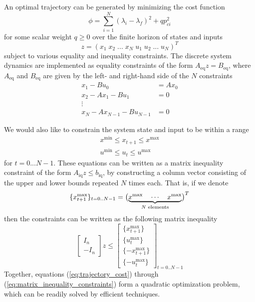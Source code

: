 An optimal trajectory can be generated by minimizing the cost function
\begin{equation}
    \label{eq:trajectory_cost}
    \phi = \sum_{i=1}^{N}(\lambda_i - \lambda_f)^2 + qp_{ci}^2
\end{equation}
for some scalar weight $q \geq 0$ over the finite horizon of states and inputs
\begin{equation}
    z = (x_1 \; x_2 \; ... \; x_N \; u_1 \; u_2 \; ... \; u_N)^T
\end{equation}
subject to various equality and inequality constraints. The discrete system dynamics are implemented as equality constraints of the form $A_{\text{eq}}z = B_{\text{eq}}$, where $A_{\text{eq}}$ and $B_{\text{eq}}$ are given by the left- and right-hand side of the $N$ constraints
\begin{align*}
    x_1 - Bu_0        &= Ax_0 \\
    x_2 - Ax_1 - Bu_1 &= 0    \\
    \vdots                    \\
    x_N - Ax_{N-1} - Bu_{N-1} &= 0
\end{align*}

We would also like to constrain the system state and input to be within a range
\begin{align}
    x^{\text{min}} \leq x_{t+1} \leq x^{\text{max}} \\
    u^{\text{min}} \leq u_t \leq u^{\text{max}}
\end{align}
for $t = 0...N-1$. These equations can be written as a matrix inequality constraint of the form $A_{\text{iq}} z \leq b_{\text{iq}}$, by constructing a column vector consisting of the upper and lower bounds repeated $N$ times each. That is, if we denote
\begin{equation}
    \{x_{t+1}^{\text{max}}\}_{t=0..N-1} =
      \bigl( \underbrace{%
      x^{\text{max}} \quad \cdots \quad x^{\text{max}}
    }_{\text{$N$~elements}} \bigr)^T
\end{equation}
then the constraints can be written as the following matrix inequality
\begin{equation}
    \label{eq:matrix_inequality_constraints}
    \begin{bmatrix} I_{n} \\ -I_{n} \end{bmatrix} z
    \leq
    \begin{bmatrix}
    \{x_{t+1}^{\text{max}}\} \\
    \{u_t^{\text{max}}\} \\
    \{-x_{t+1}^{\text{max}}\} \\
    \{-u_t^{\text{max}}\}
    \end{bmatrix}_{t=0..N-1}
\end{equation}
Together, equations (\ref{eq:trajectory_cost}) through (\ref{eq:matrix_inequality_constraints}) form a quadratic optimization problem, which can be readily solved by efficient techniques.

